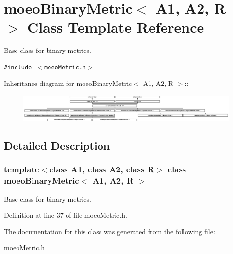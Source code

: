 \section{moeo\-Binary\-Metric$<$ A1, A2, R $>$ Class Template Reference}
\label{classmoeoBinaryMetric}
Base class for binary metrics.  


{\tt \#include $<$moeo\-Metric.h$>$}

Inheritance diagram for moeo\-Binary\-Metric$<$ A1, A2, R $>$::\begin{figure}[H]
\begin{center}
\leavevmode
\includegraphics[height=1.48018cm]{classmoeoBinaryMetric}
\end{center}
\end{figure}


\subsection{Detailed Description}
\subsubsection*{template$<$class A1, class A2, class R$>$ class moeo\-Binary\-Metric$<$ A1, A2, R $>$}

Base class for binary metrics. 



Definition at line 37 of file moeo\-Metric.h.

The documentation for this class was generated from the following file:\begin{CompactItemize}
\item 
moeo\-Metric.h\end{CompactItemize}
